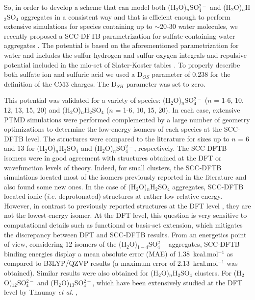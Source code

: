 \documentclass[]{interact}
\theoremstyle{plain}%
\theoremstyle{definition}
\theoremstyle{remark}
\begin{document}
So, in order to develop a scheme that can model both (H$_{2}$O)$_{n}$SO$_{4}^{2-}$ and (H$_{2}$O)$_{n}$H$_{2}$SO$_{4}$
aggregates in a consistent way and that is efficient enough to perform extensive simulations for species containing up to
$\sim$20-30 water molecules, we recently proposed a SCC-DFTB parametrization for sulfate-containing water aggregates \cite{Korchagina2016}.
The potential is based on the aforementioned parametrization for water and includes the sulfur-hydrogen and sulfur-oxygen
integrals and repulsive potential included in the mio-set of Slater-Koster tables \cite{elstner98,Niehaus2001}. To properly
describe both sulfate ion and sulfuric acid we used a D$_{OS}$ parameter of 0.238 for the definition of the CM3 charges.
The D$_{SH}$ parameter was set to zero.

This potential was validated for a variety of species:  (H$_{2}$O)$_{n}$SO$_{4}^{2-}$ ($n$ = 1-6, 10, 12, 13, 15, 20) and
(H$_{2}$O)$_{n}$H$_{2}$SO$_{4}$ ($n$ = 1-6, 10, 15, 20). In each case, extensive PTMD simulations were performed
complemented by a large number of geometry optimizations to determine the low-energy isomers of each species at the 
SCC-DFTB level. The structures were compared to the literature for sizes up to $n$ = 6 and 13 for (H$_{2}$O)$_{n}$H$_{2}$SO$_{4}$
and  (H$_{2}$O)$_{n}$SO$_{4}^{2-}$, respectively. The SCC-DFTB isomers were in good agreement with structures obtained
at the DFT or wavefunction levels of theory. Indeed, for small clusters, the SCC-DFTB simulations located most of the isomers
previously reported in the literature and also found some new ones. In the case of (H$_{2}$O)$_{n}$H$_{2}$SO$_{4}$ aggregates,
SCC-DFTB located ionic (\textit{i.e.} deprotonated) structures at rather low relative energy. However, in contrast to previously
reported structures at the DFT level \cite{re1,ding2004}, they are not the lowest-energy isomer. At the DFT level, this
question is very sensitive to computational details such as functional or basis-set extension, which mitigates the discrepancy
between DFT and SCC-DFTB results. From an energetics point of
view, considering 12 isomers of the (H$_{2}$O)$_{1-4}$SO$_{4}^{2-}$ aggregates, SCC-DFTB binding energies display a mean
absolute error (MAE) of 1.38~kcal.mol$^{-1}$ as compared to B3LYP/QZVP results (a maximum error of 2.13~kcal.mol$^{-1}$ was
obtained). Similar results were also obtained for  (H$_{2}$O)$_{n}$H$_{2}$SO$_{4}$ clusters. For (H$_{2}$O)$_{12}$SO$_{4}^{2-}$ and
(H$_{2}$O)$_{13}$SO$_{4}^{2-}$, which have been extensively studied at the DFT level by Thaunay \textit{et al. }\cite{ohanessian},
\end{document}
